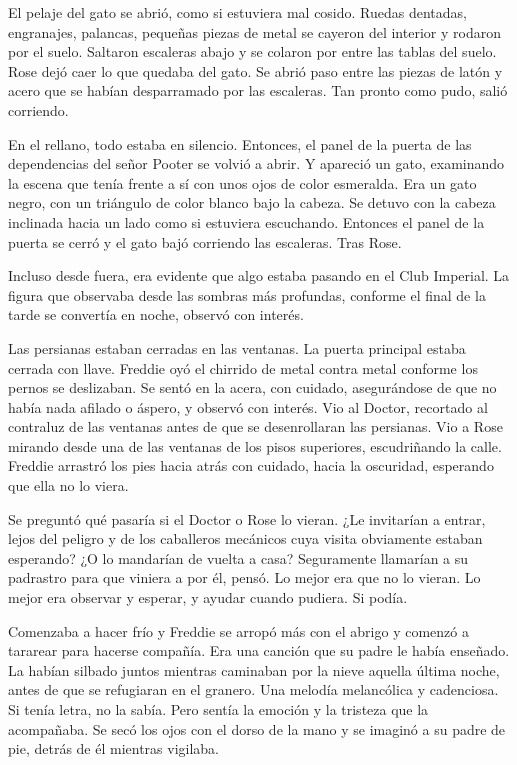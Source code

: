 {El pelaje del gato se abrió, como si estuviera mal cosido. Ruedas
	dentadas, engranajes, palancas, pequeñas piezas de metal se cayeron del
	interior y rodaron por el suelo. Saltaron escaleras abajo y se colaron
	por entre las tablas del suelo. Rose dejó caer lo que quedaba del gato.
	Se abrió paso entre las piezas de latón y acero que se habían
desparramado por las escaleras. Tan pronto como pudo, salió corriendo.}

{En el rellano, todo estaba en silencio. Entonces, el panel de la puerta
	de las dependencias del señor Pooter se volvió a abrir. Y apareció un
	gato, examinando la escena que tenía frente a sí con unos ojos de color
	esmeralda. Era un gato negro, con un triángulo de color blanco bajo la
	cabeza. Se detuvo con la cabeza inclinada hacia un lado como si
	estuviera escuchando. Entonces el panel de la puerta se cerró y el gato
bajó corriendo las escaleras. Tras Rose.}

\mbox{}

{Incluso desde fuera, era evidente que algo estaba pasando en el Club
	Imperial. La figura que observaba desde las sombras más profundas,
	conforme el final de la tarde se convertía en noche, observó con
interés.}

{Las persianas estaban cerradas en las ventanas. La puerta principal
	estaba cerrada con llave. Freddie oyó el chirrido de metal contra metal
	conforme los pernos se deslizaban. Se sentó en la acera, con cuidado,
	asegurándose de que no había nada afilado o áspero, y observó con
	interés. Vio al Doctor, recortado al contraluz de las ventanas antes de
	que se desenrollaran las persianas. Vio a Rose mirando desde una de las
	ventanas de los pisos superiores, escudriñando la calle. Freddie
	arrastró los pies hacia atrás con cuidado, hacia la oscuridad, esperando
que ella no lo viera.}

{Se preguntó qué pasaría si el Doctor o Rose lo vieran. ¿Le invitarían a
	entrar, lejos del peligro y de los caballeros mecánicos cuya visita
	obviamente estaban esperando? ¿O lo mandarían de vuelta a casa?
	Seguramente llamarían a su padrastro para que viniera a por él, pensó.
	Lo mejor era que no lo vieran. Lo mejor era observar y esperar, y ayudar
cuando pudiera. Si podía.}

{Comenzaba a hacer frío y Freddie se arropó más con el abrigo y comenzó
	a tararear para hacerse compañía. Era una canción que su padre le había
	enseñado. La habían silbado juntos mientras caminaban por la nieve
	aquella última noche, antes de que se refugiaran en el granero. Una
	melodía melancólica y cadenciosa. Si tenía letra, no la sabía. Pero
	sentía la emoción y la tristeza que la acompañaba. Se secó los ojos con
	el dorso de la mano y se imaginó a su padre de pie, detrás de él
mientras vigilaba.}


